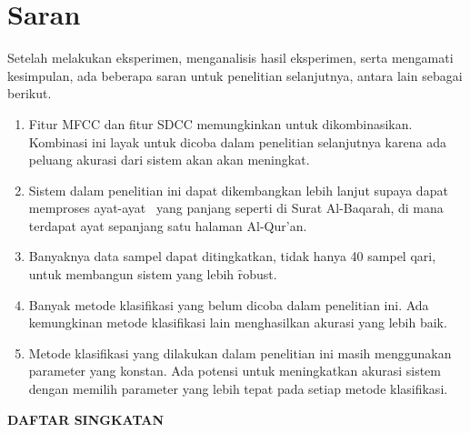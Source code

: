 \section{Saran}
Setelah melakukan eksperimen, menganalisis hasil eksperimen, serta mengamati kesimpulan, ada beberapa saran untuk penelitian selanjutnya, antara lain sebagai berikut.

\begin{enumerate}
  \item Fitur MFCC dan fitur SDCC memungkinkan untuk dikombinasikan. Kombinasi ini layak untuk dicoba dalam penelitian selanjutnya karena ada peluang akurasi dari sistem akan akan meningkat.

  \item Sistem dalam penelitian ini dapat dikembangkan lebih lanjut supaya dapat memproses ayat-ayat \quran~yang panjang seperti di Surat Al-Baqarah, di mana terdapat ayat sepanjang satu halaman Al-Qur'an.

  \item Banyaknya data sampel dapat ditingkatkan, tidak hanya 40 sampel qari, untuk membangun sistem yang lebih \f{robust}.

  \item Banyak metode klasifikasi yang belum dicoba dalam penelitian ini. Ada kemungkinan metode klasifikasi lain menghasilkan akurasi yang lebih baik.

  \item Metode klasifikasi yang dilakukan dalam penelitian ini masih menggunakan parameter yang konstan. Ada potensi untuk meningkatkan akurasi sistem dengan memilih parameter yang lebih tepat pada setiap metode klasifikasi.
\end{enumerate}%
\begin{center}
\textbf{DAFTAR SINGKATAN}
\end{center}
%
%
% 
%

